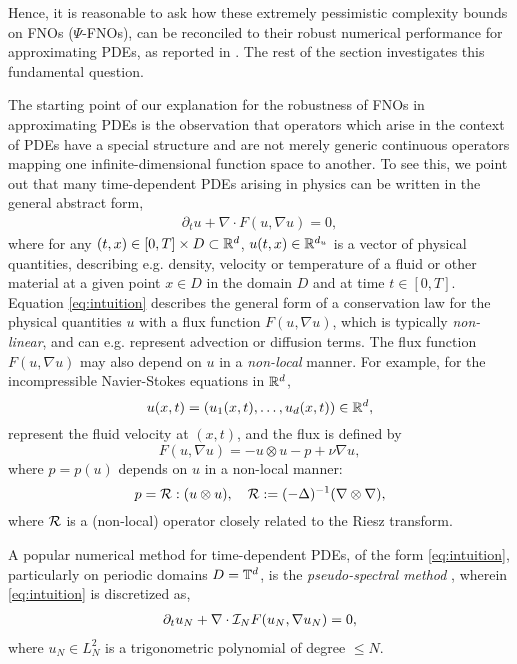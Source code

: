 \documentclass[reqno,a4paper]{amsart}
\begin{document}
Hence, it is reasonable to ask how these extremely pessimistic complexity bounds on FNOs ($\Psi$-FNOs), can be reconciled to their robust numerical performance for approximating PDEs, as reported in \cite{fourierop2020}. The rest of the section investigates this fundamental question. 

The starting point of our explanation for the robustness of FNOs in approximating PDEs is the observation that operators which arise in the context of PDEs have a special structure and are not merely generic continuous operators mapping one infinite-dimensional function space to another. To see this, we point out that many time-dependent PDEs arising in physics can be written in the general abstract form,
\begin{align}\label{eq:intuition}
\partial_t u + \nabla \cdot F(u, \nabla u) = 0,
\end{align}
where for any $(t,x) \in [0,T]\times D \subset \mathbb{R}^d$, $u(t,x) \in \mathbb{R}^{d_u}$ is a vector of physical quantities, describing e.g. density, velocity or temperature of a fluid or other material at a given point $x\in D$ in the domain $D$ and at time $t\in [0,T]$. Equation \eqref{eq:intuition} describes the general form of a conservation law for the physical quantities $u$ with a flux function $F(u,\nabla u)$, which is typically \emph{non-linear}, and can e.g. represent advection or diffusion terms. The flux function $F(u,\nabla u)$ may also depend on $u$ in a \emph{non-local} manner. For example, for the incompressible Navier-Stokes equations in $\mathbb{R}^d$, 
\[
u(x,t) = (u_1(x,t),\dots, u_d(x,t)) \in \mathbb{R}^d,
\]
represent the fluid velocity at $(x,t)$, and the flux is defined by 
\[
F(u,\nabla u) = -u\otimes u - p + \nu \nabla u,
\]
where $p = p(u)$ depends on $u$ in a non-local manner:
\[
p = \mathcal{R} : (u\otimes u), \quad \mathcal{R} := (-\Delta)^{-1} (\nabla \otimes \nabla),
\]
where $\mathcal{R}$ is a (non-local) operator closely related to the Riesz transform. 

A popular numerical method for time-dependent PDEs, of the form \eqref{eq:intuition}, particularly on periodic domains $D = \mathbb{T}^d$, is the \emph{pseudo-spectral method} \cite{Canuto2007}, wherein \eqref{eq:intuition} is discretized as,
\begin{align} \label{eq:intu0}
\partial_t u_N + \nabla \cdot \mathcal{I}_N F(u_N, \nabla u_N) = 0,
\end{align}
where $u_N \in L^2_N$ is a trigonometric polynomial of degree $\le N$.
\end{document}
